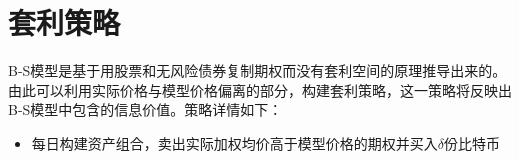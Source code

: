     \section{套利策略}
    B-S模型是基于用股票和无风险债券复制期权而没有套利空间的原理推导出来的。由此可以利用实际价格与模型价格偏离的部分，构建套利策略，这一策略将反映出B-S模型中包含的信息价值。策略详情如下：
    \begin{itemize}
        \item 每日构建资产组合，卖出实际加权均价高于模型价格的期权并买入$\delta$份比特币
    \end{itemize}
